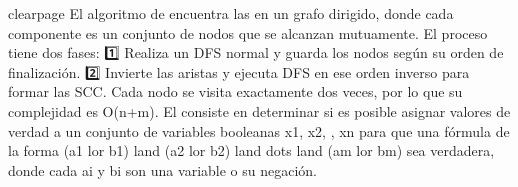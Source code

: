 \markdownRendererDocumentBegin
\markdownRendererDollarSign{}\markdownRendererBackslash{}clearpage\markdownRendererDollarSign{}\markdownRendererInterblockSeparator
{}\markdownRendererSectionBegin
\markdownRendererSectionBegin
\markdownRendererSectionBegin
{}\markdownRendererParagraphSeparator
{}
\markdownRendererSectionEnd \markdownRendererSectionBegin
{}\markdownRendererInterblockSeparator
{}El algoritmo de  encuentra las  en un grafo dirigido, donde cada componente es un conjunto de nodos que se alcanzan mutuamente. El proceso tiene dos fases:\markdownRendererHardLineBreak
{}1️⃣ Realiza un DFS normal y guarda los nodos según su orden de finalización.\markdownRendererHardLineBreak
{}2️⃣ Invierte las aristas y ejecuta DFS en ese orden inverso para formar las SCC.\markdownRendererParagraphSeparator
{}Cada nodo se visita exactamente dos veces, por lo que su complejidad es \markdownRendererDollarSign{}O(n+m)\markdownRendererDollarSign{}.\markdownRendererInterblockSeparator
{}\markdownRendererInterblockSeparator
{}
\markdownRendererSectionEnd \markdownRendererSectionBegin
{}\markdownRendererInterblockSeparator
{}
\markdownRendererSectionEnd \markdownRendererSectionBegin
{}\markdownRendererInterblockSeparator
{}El  consiste en determinar si es posible asignar valores de verdad a un conjunto de variables booleanas \markdownRendererDollarSign{}x\markdownRendererUnderscore{}1, x\markdownRendererUnderscore{}2, \markdownRendererEllipsis{}, x\markdownRendererUnderscore{}n\markdownRendererDollarSign{} para que una fórmula de la forma\markdownRendererHardLineBreak
{}\markdownRendererDollarSign{}(a\markdownRendererUnderscore{}1 \markdownRendererBackslash{}lor b\markdownRendererUnderscore{}1) \markdownRendererBackslash{}land (a\markdownRendererUnderscore{}2 \markdownRendererBackslash{}lor b\markdownRendererUnderscore{}2) \markdownRendererBackslash{}land \markdownRendererBackslash{}dots \markdownRendererBackslash{}land (a\markdownRendererUnderscore{}m \markdownRendererBackslash{}lor b\markdownRendererUnderscore{}m)\markdownRendererDollarSign{} sea verdadera, donde cada \markdownRendererDollarSign{}a\markdownRendererUnderscore{}i\markdownRendererDollarSign{} y \markdownRendererDollarSign{}b\markdownRendererUnderscore{}i\markdownRendererDollarSign{} son una variable o su negación.\markdownRendererParagraphSeparator

